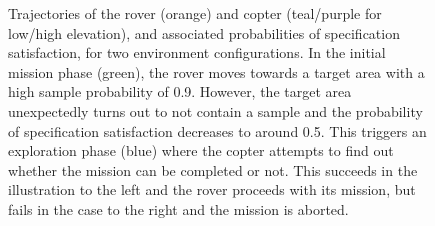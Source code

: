 \documentclass[conference]{IEEEtran}
\begin{document}
\begin{figure}
\begin{center}
\end{center}
  \caption{Trajectories of the rover (orange) and copter (teal/purple for low/high elevation), and associated probabilities of specification satisfaction, for two environment configurations. In the initial mission phase (green), the rover moves towards a target area with a high sample probability of 0.9. However, the target area unexpectedly turns out to not contain a sample and the probability of specification satisfaction decreases to around 0.5. This triggers an exploration phase (blue) where the copter attempts to find out whether the mission can be completed or not. This succeeds in the illustration to the left and the rover proceeds with its mission, but fails in the case to the right and the mission is aborted.}
  \label{fig:marstrajectories}
\end{figure}
\end{document}
